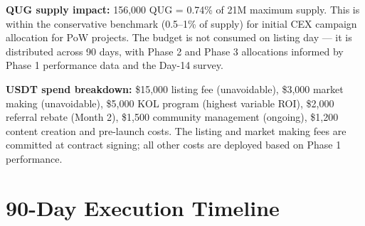\documentclass[11pt,a4paper]{article}
\begin{document}
\textbf{QUG supply impact:} 156,000 QUG = 0.74\% of 21M maximum supply. This is within the conservative benchmark (0.5--1\% of supply) for initial CEX campaign allocation for PoW projects. The budget is not consumed on listing day — it is distributed across 90 days, with Phase 2 and Phase 3 allocations informed by Phase 1 performance data and the Day-14 survey.

\textbf{USDT spend breakdown:} \$15,000 listing fee (unavoidable), \$3,000 market making (unavoidable), \$5,000 KOL program (highest variable ROI), \$2,000 referral rebate (Month 2), \$1,500 community management (ongoing), \$1,200 content creation and pre-launch costs. The listing and market making fees are committed at contract signing; all other costs are deployed based on Phase 1 performance.

\section{90-Day Execution Timeline}
\end{document}
